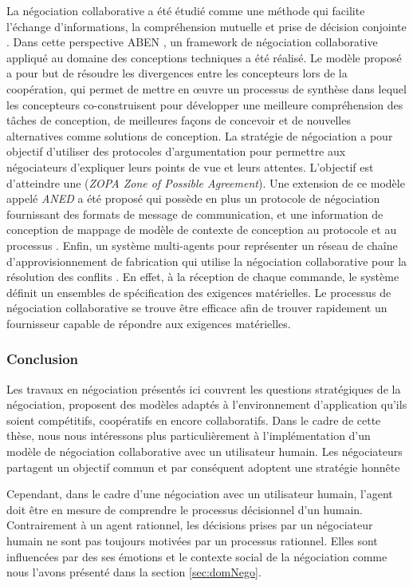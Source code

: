 		La négociation collaborative a été étudié comme une méthode qui facilite l'échange d'informations, la compréhension mutuelle et prise de décision conjointe \cite{jin2010study}. 
		Dans cette perspective ABEN \cite{jin2009argumentation}, un framework de négociation collaborative appliqué au domaine des conceptions techniques a été réalisé. Le modèle proposé a pour but de résoudre les divergences entre les concepteurs lors de la coopération, qui permet de mettre en œuvre un processus de synthèse dans lequel les concepteurs co-construisent pour développer une meilleure compréhension des tâches de conception, de meilleures façons de concevoir et de nouvelles alternatives comme solutions de conception. La stratégie de négociation a pour objectif d'utiliser des protocoles d'argumentation pour permettre aux négociateurs d'expliquer leurs points de vue et leurs attentes. L'objectif est d'atteindre une (\emph{ZOPA  Zone of Possible Agreement}). Une extension de ce modèle appelé \emph{ANED} a été proposé qui possède en plus un protocole de négociation fournissant des formats de message de communication, et une information de conception de mappage de modèle de contexte de conception au protocole et au processus \cite{jin2010study}. 	
		Enfin, un système multi-agents pour représenter un réseau de chaîne d'approvisionnement de fabrication qui utilise la négociation collaborative pour la résolution des conflits \cite{jiao2006agent}. En effet, à la réception de chaque commande, le système définit un ensembles de spécification des exigences matérielles. Le processus de négociation collaborative se trouve être efficace afin de trouver rapidement un fournisseur capable de répondre aux exigences matérielles.
		\subsubsection{Conclusion}
		  
		Les travaux en négociation présentés ici couvrent les questions stratégiques de la négociation, proposent des modèles adaptés à l'environnement d'application qu'ils soient compétitifs, coopératifs en encore collaboratifs.  Dans le cadre de cette thèse, nous nous intéressons plus particulièrement à l'implémentation d'un modèle de négociation collaborative avec un utilisateur humain. Les négociateurs partagent un objectif commun et par conséquent adoptent une stratégie honnête
		
		 Cependant, dans le cadre d'une négociation avec un utilisateur humain, l'agent doit être en mesure de comprendre le processus décisionnel d'un humain. Contrairement à un agent rationnel, les décisions prises par un négociateur humain ne sont pas toujours motivées par un processus rationnel. Elles sont influencées par des ses émotions et le contexte social de la négociation comme nous l'avons présenté dans la section \ref{sec:domNego}. 
		 
